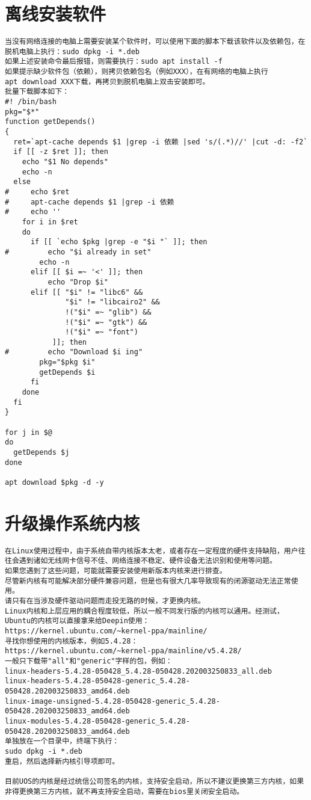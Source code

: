 \documentclass[a4paper,fontset=fandol,zihao=-4,linespread=1.2,oneside]{ctexbook}
\begin{document}
\section{离线安装软件}
\begin{lstlisting}
当没有网络连接的电脑上需要安装某个软件时，可以使用下面的脚本下载该软件以及依赖包，在脱机电脑上执行：sudo dpkg -i *.deb
如果上述安装命令最后报错，则需要执行：sudo apt install -f
如果提示缺少软件包（依赖），则拷贝依赖包名（例如XXX），在有网络的电脑上执行
apt download XXX下载，再拷贝到脱机电脑上双击安装即可。
批量下载脚本如下：
#! /bin/bash
pkg="$*"
function getDepends()
{
  ret=`apt-cache depends $1 |grep -i 依赖 |sed 's/(.*)//' |cut -d: -f2`
  if [[ -z $ret ]]; then
    echo "$1 No depends"
    echo -n
  else
#     echo $ret
#     apt-cache depends $1 |grep -i 依赖
#     echo ''
    for i in $ret
    do
      if [[ `echo $pkg |grep -e "$i "` ]]; then
#         echo "$i already in set"
        echo -n
      elif [[ $i =~ '<' ]]; then
          echo "Drop $i"
      elif [[ "$i" != "libc6" &&
              "$i" != "libcairo2" &&
              !("$i" =~ "glib") &&
              !("$i" =~ "gtk") &&
              !("$i" =~ "font")
           ]]; then
#         echo "Download $i ing"
        pkg="$pkg $i"
        getDepends $i
      fi
    done
  fi
}

for j in $@
do
  getDepends $j
done

apt download $pkg -d -y
\end{lstlisting}

\section{升级操作系统内核}
\begin{lstlisting}
在Linux使用过程中，由于系统自带内核版本太老，或者存在一定程度的硬件支持缺陷，用户往往会遇到诸如无线网卡信号不佳、网络连接不稳定、硬件设备无法识别和使用等问题。
如果您遇到了这些问题，可能就需要安装使用新版本内核来进行排查。
尽管新内核有可能解决部分硬件兼容问题，但是也有很大几率导致现有的闭源驱动无法正常使用。
请只有在当涉及硬件驱动问题而走投无路的时候，才更换内核。
Linux内核和上层应用的耦合程度较低，所以一般不同发行版的内核可以通用。经测试，Ubuntu的内核可以直接拿来给Deepin使用：
https://kernel.ubuntu.com/~kernel-ppa/mainline/
寻找你想使用的内核版本，例如5.4.28：
https://kernel.ubuntu.com/~kernel-ppa/mainline/v5.4.28/
一般只下载带"all"和"generic"字样的包，例如：
linux-headers-5.4.28-050428_5.4.28-050428.202003250833_all.deb
linux-headers-5.4.28-050428-generic_5.4.28-050428.202003250833_amd64.deb
linux-image-unsigned-5.4.28-050428-generic_5.4.28-050428.202003250833_amd64.deb
linux-modules-5.4.28-050428-generic_5.4.28-050428.202003250833_amd64.deb
单独放在一个目录中，终端下执行：
sudo dpkg -i *.deb
重启，然后选择新内核引导项即可。

目前UOS的内核是经过统信公司签名的内核，支持安全启动，所以不建议更换第三方内核，如果非得更换第三方内核，就不再支持安全启动，需要在bios里关闭安全启动。
\end{lstlisting}
\end{document}
